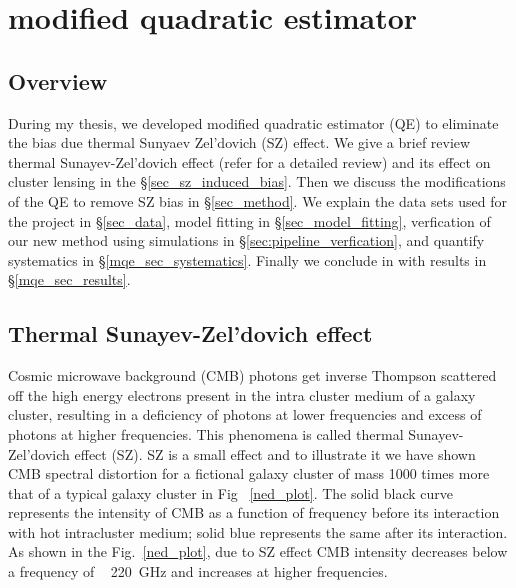 \chapter{modified quadratic estimator}
\label{ch:mqe}
\section*{Overview}\label{ovr}
During my thesis, we developed modified quadratic estimator (QE) to eliminate the bias due thermal Sunyaev Zel'dovich (SZ) effect. 
We give a brief review thermal Sunayev-Zel'dovich effect (refer \cite{sunyaev70b} for a detailed review) and its effect on cluster lensing in the \S\ref{sec_sz_induced_bias}.
Then we discuss the modifications of the QE to remove SZ bias in \S\ref{sec_method}.
 We explain the data sets used for the project in \S\ref{sec_data}, model fitting in \S\ref{sec_model_fitting}, verfication of our new method using simulations in \S\ref{sec:pipeline_verfication}, and quantify systematics in \S\ref{mqe_sec_systematics}.
Finally we conclude in with results in \S\ref{mqe_sec_results}.


\section{Thermal Sunayev-Zel'dovich effect}\label{SZ}

 Cosmic microwave background (CMB) photons get inverse Thompson scattered off the high energy electrons present in the intra cluster medium of a galaxy cluster, resulting in a deficiency of photons at lower frequencies and excess of photons at higher frequencies. 
 This phenomena is called thermal Sunayev-Zel'dovich effect (SZ). 
 SZ is a small effect and to illustrate it we have shown CMB spectral distortion for a fictional galaxy cluster of mass 1000 times more that of a typical galaxy cluster in Fig ~\ref{ned_plot}.
 The solid black curve represents the intensity of CMB as a function of frequency before its interaction with hot intracluster medium; solid blue represents the same after its interaction.
 As shown in the Fig.~\ref{ned_plot}, due to SZ effect CMB intensity decreases below a frequency of ~ 220 \,GHz and increases at higher frequencies. 
   
